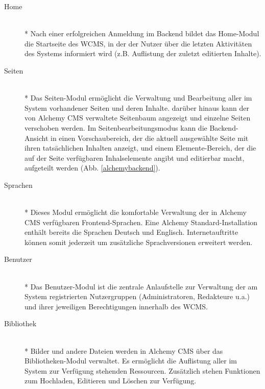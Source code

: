 \begin{description}
\item[Home]\mbox{~}\\*
Nach einer erfolgreichen Anmeldung im Backend bildet das Home-Modul die Startseite des WCMS, in der der Nutzer über die letzten Aktivitäten des Systems informiert wird (z.B. Auflistung der zuletzt editierten Inhalte).
\item[Seiten]\mbox{~}\\*
Das Seiten-Modul ermöglicht die Verwaltung und Bearbeitung aller im System vorhandener Seiten und deren Inhalte. darüber hinaus kann der von Alchemy CMS verwaltete Seitenbaum angezeigt und einzelne Seiten verschoben werden. Im Seitenbearbeitungsmodus kann die Backend-Ansicht in einen Vorschaubereich, der die aktuell ausgewählte Seite mit ihren tatsächlichen Inhalten anzeigt, und einem Elemente-Bereich, der die auf der Seite verfügbaren Inhalselemente angibt und editierbar macht, aufgeteilt werden (Abb. \ref{alchemybackend}).
\item[Sprachen]\mbox{~}\\*
Dieses Modul ermöglicht die komfortable Verwaltung der in Alchemy CMS verfügbaren Frontend-Sprachen. Eine Alchemy Standard-Installation enthält bereits die Sprachen Deutsch und Englisch. Internetauftritte können somit jederzeit um zusätzliche Sprachversionen erweitert werden.
\item[Benutzer]\mbox{~}\\*
Das Benutzer-Modul ist die zentrale Anlaufstelle zur Verwaltung der am System registrierten Nutzergruppen (Administratoren, Redakteure u.a.) und ihrer jeweiligen Berechtigungen innerhalb des WCMS.
\item[Bibliothek]\mbox{~}\\*
Bilder und andere Dateien werden in Alchemy CMS über das Bibliotheken-Modul verwaltet. Es ermöglicht die Auflistung aller im System zur Verfügung stehenden Ressourcen. Zusätzlich stehen Funktionen zum Hochladen, Editieren und Löschen zur Verfügung.
\end{description}
